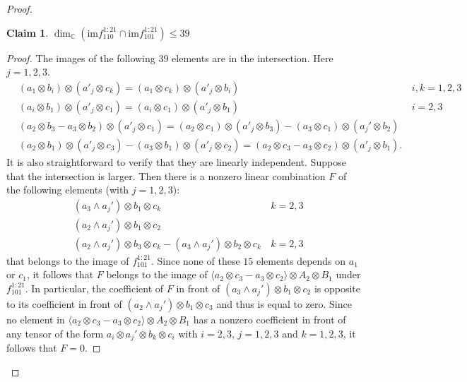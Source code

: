\documentclass[12pt]{amsart}
\newtheorem{claim}{Claim}
\theoremstyle{definition}
\theoremstyle{remark}
\theoremstyle{definition}
\newcommand{\CC}{\mathbb{C}}
\begin{document}
\begin{proof}
\begin{claim}\label{cl:1:21}
    $\dim_\CC (\mathrm{im} f_{110}^{1:21} \cap \mathrm{im} f_{101}^{1:21}) \le 39$
\end{claim}
\begin{proof}
    The images of the following $39$ elements are in the intersection. Here $j=1,2,3.$
    \begin{align*}
        &(a_1\otimes b_i)\otimes (a'_j\otimes c_k)  = (a_1\otimes c_k) \otimes (a'_j\otimes b_i)&\, i,k = 1,2,3\\
        &(a_i\otimes b_1)\otimes (a'_j\otimes c_1) = (a_i\otimes c_1) \otimes (a'_j\otimes b_1) &\, i=2,3\\
        &(a_2\otimes b_3 - a_3\otimes b_2) \otimes (a'_j \otimes c_1) = (a_2\otimes c_1)\otimes (a'_j \otimes b_3) - (a_3\otimes c_1)\otimes (a_j'\otimes b_2) \\
        &(a_2\otimes b_1)\otimes (a'_j\otimes c_3) - (a_3\otimes b_1)\otimes (a'_j\otimes c_2) = (a_2\otimes c_3 - a_3\otimes c_2) \otimes (a'_j\otimes b_1).     \end{align*}
    It is also straightforward to verify that they are linearly independent.
Suppose that the intersection is larger. Then there is a nonzero linear combination $F$ of the following elements (with $j=1,2,3$):
\begin{align*}
    & (a_3\wedge a_j') \otimes b_1 \otimes c_k &\, k=2,3\\
    & (a_2\wedge a_j') \otimes b_1 \otimes c_2 \\
    & (a_2\wedge a_j')\otimes b_3\otimes c_k - (a_3\wedge a_j')\otimes  b_2\otimes c_k &\, k=2,3
\end{align*}
that belongs to the image of $f_{101}^{1:21}$. Since none of these $15$ elements depends on $a_1$ or $c_1$, it follows that $F$ belongs to the image of $\langle a_2\otimes c_3 - a_3\otimes c_2\rangle\otimes A_2\otimes B_1$ under $f_{101}^{1:21}$.
In particular, the coefficient of $F$ in front of $(a_3\wedge a_j')\otimes b_1 \otimes c_2$ is opposite to its coefficient in front of $(a_2\wedge a_j')\otimes b_1 \otimes c_3$ and thus is equal to zero. Since no element in  $\langle a_2\otimes c_3 - a_3\otimes c_2\rangle\otimes A_2\otimes B_1$ has a nonzero coefficient in front of any tensor of the form $a_i\otimes a_j' \otimes b_k\otimes c_i$ with $i=2,3$, $j=1,2,3$ and $k=1,2,3$, it follows that $F = 0$.
\end{proof}


\end{proof}
\end{document}
